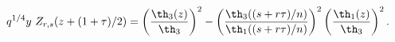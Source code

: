 \begin{equation}
   q^{1/4} y ~Z_{r,s}(z+(1+\tau)/2)=  \left(
   {\th_3(z)\over \th_3} \right)^2 - \left( 
   {\th_3((s+r\tau)/n)\over \th_1((s+r\tau)/n)} \right)^2
   \left( {\th_1(z)\over\th_3} \right)^2.
\end{equation}

